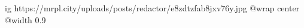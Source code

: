  
 
 
 
 

\ifcmt
  ig https://mrpl.city/uploads/posts/redactor/e8zdtzfab8jxv76y.jpg
  @wrap center
  @width 0.9
\fi
